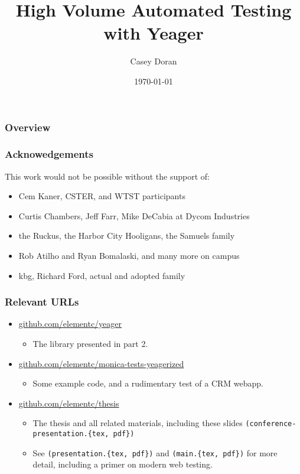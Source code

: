 \documentclass{beamer}
\title[Yeager]{High Volume Automated Testing with Yeager}
\author{Casey Doran}
\institute[Florida Tech]
{
Florida Institute of Technology \\
\medskip
\textit{cdoran2011@my.fit.edu}
}
\date{\today}
\begin{document}
\begin{frame}
\titlepage
\end{frame}

\begin{frame}
\frametitle{Overview}
\tableofcontents
\end{frame}

\begin{frame}
  \frametitle{Acknowedgements}
  This work would not be possible without the support of:
  \begin{itemize}
    \item Cem Kaner, CSTER, and WTST participants
    \item Curtis Chambers, Jeff Farr, Mike DeCabia at Dycom Industries
    \item the Ruckus, the Harbor City Hooligans, the Samuels family
    \item Rob Atilho and Ryan Bomalaski, and many more on campus
    \item kbg, Richard Ford, actual and adopted family
  \end{itemize}
\end{frame}


\begin{frame}
  \frametitle{Relevant URLs}
  \begin{itemize}
    \item \url{github.com/elementc/yeager}
    \begin{itemize}
      \item The library presented in part 2.
    \end{itemize}
    \item \url{github.com/elementc/monica-tests-yeagerized}
    \begin{itemize}
      \item Some example code, and a rudimentary test of a CRM webapp.
    \end{itemize}
    \item \url{github.com/elementc/thesis}
    \begin{itemize}
      \item The thesis and all related materials, including these slides \texttt{(conference-presentation.\{tex, pdf\})}
      \item See \texttt{(presentation.\{tex, pdf\})} and \texttt{(main.\{tex, pdf\})} for more detail, including a primer on modern web testing.

    \end{itemize}
  \end{itemize}
\end{frame}
\end{document}
